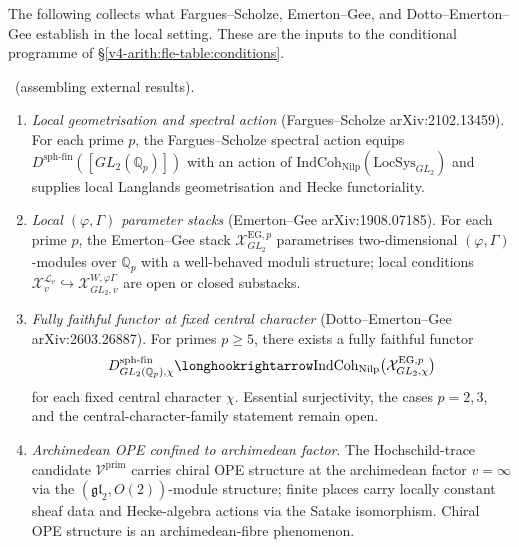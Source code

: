 The following collects what Fargues--Scholze, Emerton--Gee, and
Dotto--Emerton--Gee establish in the local setting. These are the
inputs to the conditional programme of \S\ref{v4-arith:fle-table:conditions}.

\begin{theorem}
\label{v4-arith:fle-table:thm:local-inputs}
\ClaimStatusProvedHere\ (assembling external results).
\begin{enumerate}
\item \emph{Local geometrisation and spectral action}
  (Fargues--Scholze arXiv:2102.13459). For each prime \(p\),
  the Fargues--Scholze spectral action equips
  \(D^{\mathrm{sph}\text{-}\mathrm{fin}}([GL_{2}(\mathbb{Q}_{p})])\)
  with an action of \(\mathrm{IndCoh}_{\mathrm{Nilp}}(\mathrm{LocSys}_{GL_{2}})\)
  and supplies local Langlands geometrisation and Hecke functoriality.

\item \emph{Local \((\varphi,\Gamma)\) parameter stacks}
  (Emerton--Gee arXiv:1908.07185). For each prime \(p\), the
  Emerton--Gee stack
  \(\mathcal{X}^{\mathrm{EG},p}_{GL_{2}}\) parametrises
  two-dimensional \((\varphi,\Gamma)\)-modules over \(\mathbb{Q}_{p}\)
  with a well-behaved moduli structure; local conditions
  \(\mathcal{X}^{\mathcal{L}_{v}}_{v}\hookrightarrow
  \mathcal{X}^{W,\varphi\Gamma}_{GL_{2},v}\) are open or closed
  substacks.

\item \emph{Fully faithful functor at fixed central character}
  (Dotto--Emerton--Gee arXiv:2603.26887). For primes
  \(p \geq 5\), there exists a fully faithful functor
  \[
  D^{\mathrm{sph}\text{-}\mathrm{fin}}_{GL_{2}(\mathbb{Q}_{p}),\chi}
  \longhookrightarrow
  \mathrm{IndCoh}_{\mathrm{Nilp}}\bigl(\mathcal{X}^{\mathrm{EG},p}_{GL_{2},\chi}\bigr)
  \]
  for each fixed central character \(\chi\). Essential surjectivity,
  the cases \(p = 2,3\), and the central-character-family
  statement remain open.

\item \emph{Archimedean OPE confined to archimedean factor}.
  The Hochschild-trace candidate \(\mathcal{V}^{\mathrm{prim}}\)
  carries chiral OPE structure at the archimedean factor
  \(v = \infty\) via the \((\mathfrak{gl}_{2},O(2))\)-module structure;
  finite places carry locally constant sheaf data and Hecke-algebra
  actions via the Satake isomorphism. Chiral OPE structure is an
  archimedean-fibre phenomenon.


\end{enumerate}
\end{theorem}
